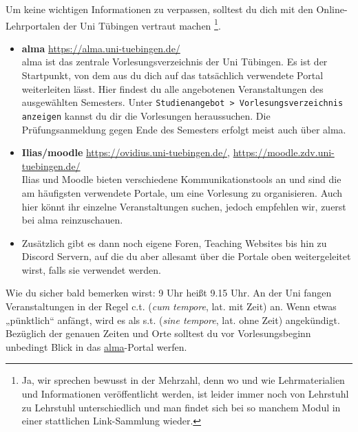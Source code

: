Um keine wichtigen Informationen zu verpassen, solltest du dich mit den Online-Lehrportalen der Uni Tübingen vertraut machen
\footnote{Ja, wir sprechen bewusst in der Mehrzahl, denn wo und wie Lehrmaterialien und Informationen veröffentlicht werden, ist leider immer noch
von Lehrstuhl zu Lehrstuhl unterschiedlich und man findet sich bei so manchem Modul in einer stattlichen Link-Sammlung wieder.}.
\begin{itemize}
	\item \textbf{\hypertarget{alma}{alma}} \url{https://alma.uni-tuebingen.de/} \\
	alma ist das zentrale Vorlesungsverzeichnis der Uni Tübingen. Es ist der Startpunkt, von dem aus du dich auf das tatsächlich verwendete Portal weiterleiten lässt.
	Hier findest du alle angebotenen Veranstaltungen des ausgewählten Semesters. Unter \texttt{Studienangebot > Vorlesungsverzeichnis anzeigen} kannst du dir die Vorlesungen heraussuchen. Die Prüfungsanmeldung gegen Ende des Semesters erfolgt meist auch über alma.
	\item \textbf{Ilias/moodle} \url{https://ovidius.uni-tuebingen.de/}, \url{https://moodle.zdv.uni-tuebingen.de/} \\
	Ilias und Moodle bieten verschiedene Kommunikationstools an und sind die am häufigsten verwendete Portale, um eine Vorlesung zu organisieren.
	Auch hier könnt ihr einzelne Veranstaltungen suchen, jedoch empfehlen wir, zuerst bei alma reinzuschauen.
	\item Zusätzlich gibt es dann noch eigene Foren, Teaching Websites bis hin zu Discord Servern, auf die du aber allesamt über die Portale oben
	weitergeleitet wirst, falls sie verwendet werden.
\end{itemize}


Wie du sicher bald bemerken wirst: 9 Uhr heißt 9.15 Uhr. An der Uni fangen Veranstaltungen in der Regel c.t. (\textit{cum
tempore}, lat. \glqq mit Zeit\grqq) an. Wenn etwas „pünktlich“ anfängt, wird es als s.t. (\textit{sine tempore}, lat. \glqq ohne
Zeit\grqq) angekündigt.
Bezüglich der genauen Zeiten und Orte solltest du vor Vorlesungsbeginn unbedingt Blick in das \hyperlink{alma}{alma}-Portal werfen.

\ifmaster \pagebreak \fi

